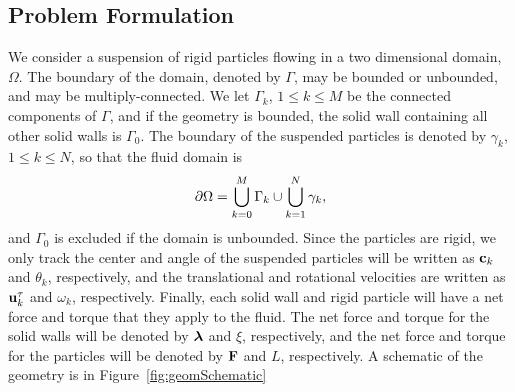 \documentclass[preprint, 10pt]{elsarticle}
\begin{document}
\subsection{Problem Formulation}

We consider a suspension of rigid particles flowing in a two dimensional
domain, $\Omega$.  The boundary of the domain, denoted by $\Gamma$, may
be bounded or unbounded, and may be multiply-connected.  We let
$\Gamma_k$, $1 \leq k \leq M$ be the connected components of $\Gamma$,
and if the geometry is bounded, the solid wall containing all other
solid walls is $\Gamma_0$.  The boundary of the suspended particles is
denoted by $\gamma_k$, $1 \leq k \leq N$, so that the fluid domain is
\begin{align*}
  {\partial}\Omega = \bigcup_{k=0}^M \Gamma_k \cup \bigcup_{k=1}^N \gamma_k,
\end{align*}
and $\Gamma_0$ is excluded if the domain is unbounded.  Since the
particles are rigid, we only track the center and angle of the suspended
particles will be written as ${\mathbf{c}}_k$ and $\theta_k$, respectively, and
the translational and rotational velocities are written as ${\mathbf{u}}_k^\tau$
and $\omega_k$, respectively.  Finally, each solid wall and rigid
particle will have a net force and torque that they apply to the fluid.
The net force and torque for the solid walls will be denoted by
${\boldsymbol\lambda}$ and $\xi$, respectively, and the net force and torque for the
particles will be denoted by ${\mathbf{F}}$ and $L$, respectively.  A schematic
of the geometry is in Figure~\ref{fig:geomSchematic}

%
\end{document}
